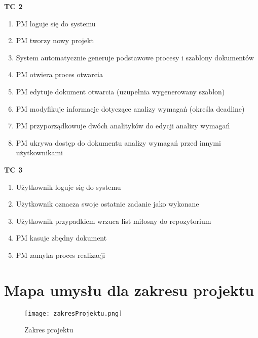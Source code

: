 \textbf{TC 2}
\begin{enumerate}
\item PM loguje się do systemu
\item PM tworzy nowy projekt
\item System automatycznie generuje podstawowe procesy i szablony dokumentów
\item PM otwiera proces otwarcia
\item PM edytuje dokument otwarcia (uzupełnia wygenerowany szablon)
\item PM modyfikuje informacje dotyczące analizy wymagań (określa deadline)
\item PM przyporządkowuje dwóch analityków do edycji analizy wymagań
\item PM ukrywa dostęp do dokumentu analizy wymagań przed innymi użytkownikami
\end{enumerate}


\textbf{TC 3}
\begin{enumerate}
\item Użytkownik loguje się do systemu
\item Użytkownik oznacza swoje ostatnie zadanie jako wykonane
\item Użytkownik przypadkiem wrzuca list miłosny do repozytorium
\item PM kasuje zbędny dokument
\item PM zamyka proces realizacji
\end{enumerate}

\clearpage


\section{Mapa umysłu dla zakresu projektu}

\begin{figure}[!h]
\centering
\texttt{[image: zakresProjektu.png]}
\caption{Zakres projektu}
\label{fig:zakresProjektu}
\end{figure}




